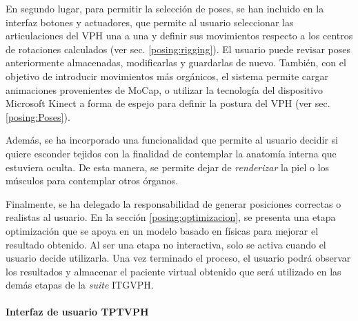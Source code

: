En segundo lugar, para permitir la selección de poses, se han incluido en la interfaz botones y actuadores, que permite al usuario seleccionar las articulaciones del \ac{VPH} una a una y definir sus movimientos respecto a los centros de rotaciones calculados (ver sec. \ref{posing:rigging}). El usuario puede revisar poses anteriormente almacenadas, modificarlas y guardarlas de nuevo. También, con el objetivo de introducir movimientos más orgánicos, el sistema permite cargar animaciones provenientes de \ac{MoCap}, o utilizar la tecnología del dispositivo Microsoft Kinect a forma de espejo para definir la postura del \ac{VPH} (ver sec. \ref{posing:Poses}).

Además, se ha incorporado una funcionalidad que permite al usuario decidir si quiere esconder tejidos con la finalidad de contemplar la anatomía interna que estuviera oculta. De esta manera, se permite dejar de \emph{renderizar} la piel o los músculos para contemplar otros órganos.%

Finalmente, se ha delegado la responsabilidad de generar posiciones correctas o realistas al usuario. En la sección \ref{posing:optimizacion}, se presenta una etapa optimización que se apoya en un modelo basado en físicas para mejorar el resultado obtenido. Al ser una etapa no interactiva, solo se activa cuando el usuario decide utilizarla. Una vez terminado el proceso, el usuario podrá observar los resultados y almacenar el paciente virtual obtenido que será utilizado en las demás etapas de la \emph{suite} \ac{ITGVPH}.  


\paragraph{Interfaz de usuario \ac{TPTVPH}}\mbox{}\\

